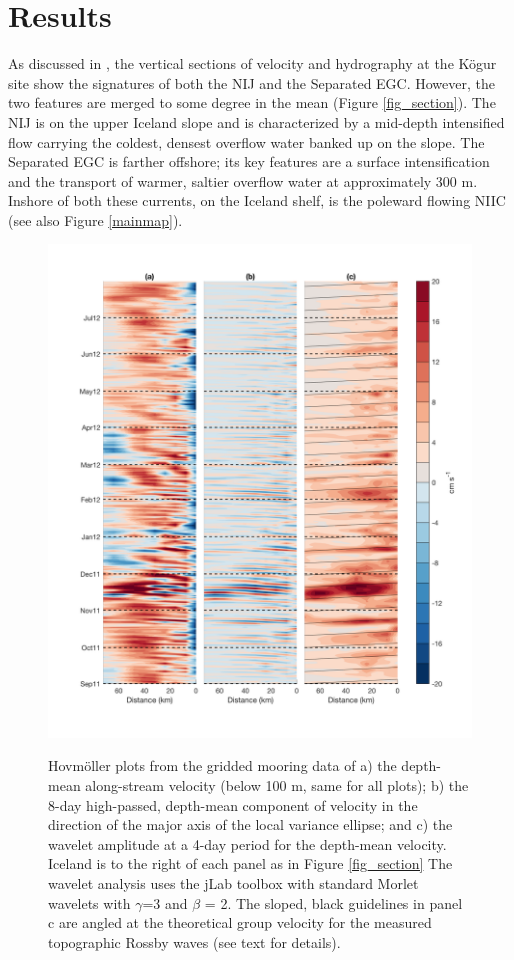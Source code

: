 \documentclass[12pt,titlepage,figuresatend]{article}
\begin{document}
\section{Results}
\label{results}

As discussed in \cite{Harden2016}, the vertical sections of velocity and hydrography at the K\"{o}gur site show the signatures of both the NIJ and the Separated EGC. However, the two features are merged to some degree in the mean (Figure \ref{fig_section}). The NIJ is on the upper Iceland slope and is characterized by a mid-depth intensified flow carrying the coldest, densest overflow water banked up on the slope. The Separated EGC is farther offshore; its key features are a surface intensification and the transport of warmer, saltier overflow water at approximately 300 m. Inshore of both these currents, on the Iceland shelf, is the poleward flowing NIIC (see also Figure \ref{mainmap}).


\begin{figure}[p!]
  \centering\includegraphics[width=\hsize]{./figures/hoff_vars.pdf}
  \caption{Hovm\"{o}ller plots from the gridded mooring data of a) the depth-mean along-stream velocity (below 100 m, same for all plots); b) the 8-day high-passed, depth-mean component of velocity in the direction of the major axis of the local variance ellipse; and c) the wavelet amplitude at a 4-day period for the depth-mean velocity. Iceland is to the right of each panel as in Figure \ref{fig_section} The wavelet analysis uses the jLab toolbox \cite[]{Lilly2017} with standard Morlet wavelets with $\gamma$=3 and $\beta$ = 2. The sloped, black guidelines in panel c are angled at the theoretical group velocity for the measured topographic Rossby waves (see text for details).}{\label{fig_hoff}}
\end{figure}
\end{document}
